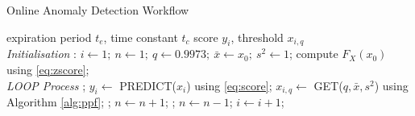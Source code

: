 \begin{algorithm}[H]
\caption{{Online Anomaly Detection Workflow}} \label{alg:detector}
 \begin{algorithmic}[1]
  \renewcommand{\algorithmicrequire}{\textbf{Input:}}
  \renewcommand{\algorithmicensure}{\textbf{Output:}}
  \REQUIRE expiration period $t_e$, time constant $t_c$
  \ENSURE  score $y_i$, threshold $x_{i,q}$
 \\ \textit{Initialisation} : 
  \STATE $i \leftarrow 1;~ n \leftarrow 1;~ q \leftarrow 0.9973;~ \bar x  \leftarrow x_0;~  s^2 \leftarrow 1$;
  \STATE compute $F_X(x_0)$ using \eqref{eq:zscore};
 \\ \textit{LOOP Process}
  \LOOP
    ;
    \STATE $y_i \leftarrow$ PREDICT($x_i$) using \eqref{eq:score};
    \STATE $x_{i,q} \leftarrow$ GET($q, \bar x, s^2$) using Algorithm \ref{alg:ppf};
    \IF {\eqref{eq:score_norm} \OR \eqref{eq:condition}}
     ;
     \STATE $n \leftarrow n + 1$;
      ;
      \STATE $n \leftarrow n - 1$;
     \ENDFOR
    \ENDIF
    \STATE $i \leftarrow i + 1$;
  \ENDLOOP
 \end{algorithmic}
\end{algorithm}